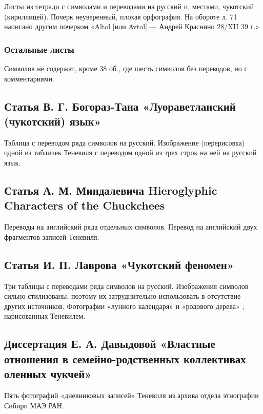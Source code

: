 \documentclass{article}
\newcounter{glyph}
\begin{document}
Листы из тетради с символами и переводами на русский и, местами, чукотский (кириллицей). Почерк неуверенный, плохая орфография. На обороте л. 71 написано другим почерком «Altol [или Avtol] — Андрей Краснино 28/XII 39 г.»

\subsubsection{Остальные листы}

Символов не содержат, кроме 38 об., где шесть символов без переводов, но с комментариями.

\subsection{Статья В. Г. Богораз-Тана «Луораветланский (чукотский) язык»}

Таблица с переводом ряда символов на русский. Изображение (перерисовка) одной из табличек Теневиля с переводом одной из трех строк на ней на русский язык.

\subsection{Статья А. М. Миндалевича Hieroglyphic Characters of the Chuckchees}

Переводы на английский ряда отдельных символов. Перевод на английский двух фрагментов записей Теневиля.

\subsection{Статья И. П. Лаврова «Чукотский феномен»}

Три таблицы с переводами ряда символов на русский. Изображения символов сильно стилизованы, поэтому их затруднительно использовать в отсутствие других источников. Фотографии «лунного календаря» и «родового дерева» , нарисованных Теневилем.

\subsection{Диссертация Е. А. Давыдовой «Властные отношения в семейно-родственных коллективах оленных чукчей»}

Пять фотографий «дневниковых записей» Теневиля из архива отдела этнографии Сибири МАЭ РАН.

\printbibliography
\end{document}

